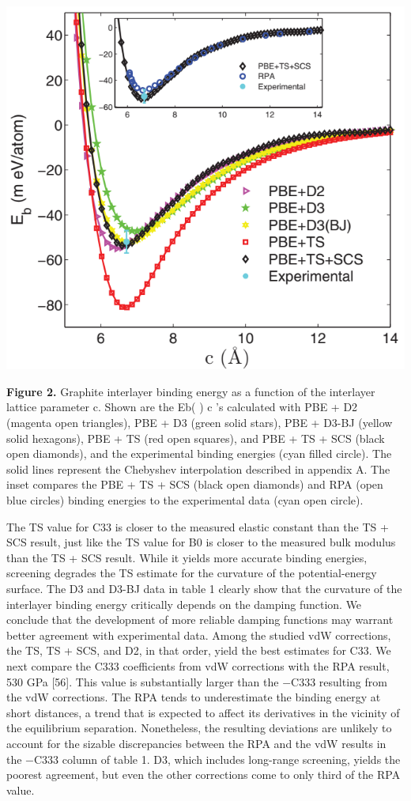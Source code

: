 \documentclass{article}
\begin{document}
\includegraphics{_page_8_Figure_2.png}


\textbf{Figure 2.} Graphite interlayer binding energy as a function of the interlayer lattice parameter c. Shown are the Eb( ) c 's calculated with PBE + D2 (magenta open triangles), PBE + D3 (green solid stars), PBE + D3-BJ (yellow solid hexagons), PBE + TS (red open squares), and PBE + TS + SCS (black open diamonds), and the experimental binding energies (cyan filled circle). The solid lines represent the Chebyshev interpolation described in appendix A. The inset compares the PBE + TS + SCS (black open diamonds) and RPA (open blue circles) binding energies to the experimental data (cyan open circle).

The TS value for C33 is closer to the measured elastic constant than the TS + SCS result, just like the TS value for B0 is closer to the measured bulk modulus than the TS + SCS result. While it yields more accurate binding energies, screening degrades the TS estimate for the curvature of the potential-energy surface. The D3 and D3-BJ data in table 1 clearly show that the curvature of the interlayer binding energy critically depends on the damping function. We conclude that the development of more reliable damping functions may warrant better agreement with experimental data. Among the studied vdW corrections, the TS, TS + SCS, and D2, in that order, yield the best estimates for C33. We next compare the C333 coefficients from vdW corrections with the RPA result, 530 GPa [56]. This value is substantially larger than the −C333 resulting from the vdW corrections. The RPA tends to underestimate the binding energy at short distances, a trend that is expected to affect its derivatives in the vicinity of the equilibrium separation. Nonetheless, the resulting deviations are unlikely to account for the sizable discrepancies between the RPA and the vdW results in the −C333 column of table 1. D3, which includes long-range screening, yields the poorest agreement, but even the other corrections come to only third of the RPA value.
\end{document}
